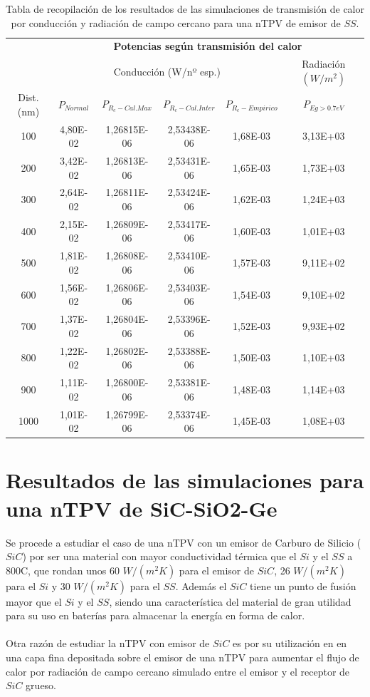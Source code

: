 \begin{table}[H]
	\centering
	\caption{Tabla de recopilación de los resultados de las simulaciones de transmisión de calor por conducción y radiación de campo cercano para una nTPV de emisor de $SS$.}
		\begin{tabular}{|c||c|c|c|c||c|}
		\hline
		\multirow{2}{*}{ }& \multicolumn{5}{c|}{\textbf{\large Potencias según transmisión del calor}}\\ \cline{2-6}
& \multicolumn{4}{c||}{Conducción (W/nº esp.)}& Radiación $(W/m^2)$\\ \hline
Dist. (nm)&$P_{Normal}$&$P_{R_c-Cal.Max}$&$P_{R_c-Cal.Inter}$&$P_{R_c-Empirico}$&$P_{Eg>0.7eV}$\\ \hline \hline
100&4,80E-02&1,26815E-06&2,53438E-06&1,68E-03&3,13E+03\\ \hline 
200&3,42E-02&1,26813E-06&2,53431E-06&1,65E-03&1,73E+03\\ \hline 
300&2,64E-02&1,26811E-06&2,53424E-06&1,62E-03&1,24E+03\\ \hline 
400&2,15E-02&1,26809E-06&2,53417E-06&1,60E-03&1,01E+03\\ \hline 
500&1,81E-02&1,26808E-06&2,53410E-06&1,57E-03&9,11E+02\\ \hline 
600&1,56E-02&1,26806E-06&2,53403E-06&1,54E-03&9,10E+02\\ \hline 
700&1,37E-02&1,26804E-06&2,53396E-06&1,52E-03&9,93E+02\\ \hline 
800&1,22E-02&1,26802E-06&2,53388E-06&1,50E-03&1,10E+03\\ \hline 
900&1,11E-02&1,26800E-06&2,53381E-06&1,48E-03&1,14E+03\\ \hline 
1000&1,01E-02&1,26799E-06&2,53374E-06&1,45E-03&1,08E+03\\ \hline 
		\end{tabular}
	\label{tab:SsSiO2Ge}
\end{table}
\vfill \newpage
\section{Resultados de las simulaciones para una nTPV de SiC-SiO2-Ge}\label{sec:res_SiCSiO2Ge}
Se procede a estudiar el caso de una nTPV con un emisor de Carburo de Silicio ($SiC$) por ser una material con mayor conductividad térmica que el $Si$ y el $SS$ a 800\textdegree C, que rondan unos 60 $W/(m^2 K)$ para el emisor de $SiC$, 26 $W/(m^2 K)$ para el $Si$ y 30 $W/(m^2 K)$ para el $SS$. Además el $SiC$ tiene un punto de fusión mayor que el $Si$ y el $SS$, siendo una característica del material de gran utilidad para su uso en baterías para almacenar la energía en forma de calor.\\\\
Otra razón de estudiar la nTPV con emisor de $SiC$ es por su utilización en \cite{doi:Near_field_ThinFilm} en una capa fina depositada sobre el emisor de una nTPV para aumentar el flujo de calor por radiación de campo cercano simulado entre el emisor y el receptor de $SiC$ grueso.
